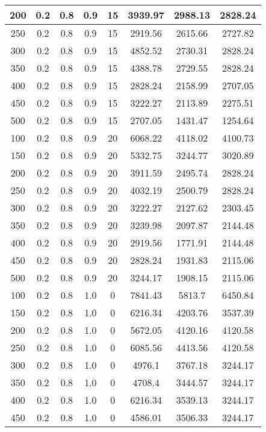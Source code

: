 \documentclass[a4paper, 12pt]{extreport}
\begin{document}
\begin{itemize}
\begin{longtable}{|c|c|c|c|c|c|c|c|}
			200 & 0.2 & 0.8 & 0.9 & 15 & 3939.97 & 2988.13 & 2828.24 \\\hline
			250 & 0.2 & 0.8 & 0.9 & 15 & 2919.56 & 2615.66 & 2727.82 \\\hline
			300 & 0.2 & 0.8 & 0.9 & 15 & 4852.52 & 2730.31 & 2828.24 \\\hline
			350 & 0.2 & 0.8 & 0.9 & 15 & 4388.78 & 2729.55 & 2828.24 \\\hline
			400 & 0.2 & 0.8 & 0.9 & 15 & 2828.24 & 2158.99 & 2707.05 \\\hline
			450 & 0.2 & 0.8 & 0.9 & 15 & 3222.27 & 2113.89 & 2275.51 \\\hline
			500 & 0.2 & 0.8 & 0.9 & 15 & 2707.05 & 1431.47 & 1254.64 \\\hline
			100 & 0.2 & 0.8 & 0.9 & 20 & 6068.22 & 4118.02 & 4100.73 \\\hline
			150 & 0.2 & 0.8 & 0.9 & 20 & 5332.75 & 3244.77 & 3020.89 \\\hline
			200 & 0.2 & 0.8 & 0.9 & 20 & 3911.59 & 2495.74 & 2828.24 \\\hline
			250 & 0.2 & 0.8 & 0.9 & 20 & 4032.19 & 2500.79 & 2828.24 \\\hline
			300 & 0.2 & 0.8 & 0.9 & 20 & 3222.27 & 2127.62 & 2303.45 \\\hline
			350 & 0.2 & 0.8 & 0.9 & 20 & 3239.98 & 2097.87 & 2144.48 \\\hline
			400 & 0.2 & 0.8 & 0.9 & 20 & 2919.56 & 1771.91 & 2144.48 \\\hline
			450 & 0.2 & 0.8 & 0.9 & 20 & 2828.24 & 1931.83 & 2115.06 \\\hline
			500 & 0.2 & 0.8 & 0.9 & 20 & 3244.17 & 1908.15 & 2115.06 \\\hline
			100 & 0.2 & 0.8 & 1.0 & 0 & 7841.43 & 5813.7 & 6450.84 \\\hline
			150 & 0.2 & 0.8 & 1.0 & 0 & 6216.34 & 4203.76 & 3537.39 \\\hline
			200 & 0.2 & 0.8 & 1.0 & 0 & 5672.05 & 4120.16 & 4120.58 \\\hline
			250 & 0.2 & 0.8 & 1.0 & 0 & 6085.56 & 4413.56 & 4120.58 \\\hline
			300 & 0.2 & 0.8 & 1.0 & 0 & 4976.1 & 3767.18 & 3244.17 \\\hline
			350 & 0.2 & 0.8 & 1.0 & 0 & 4708.4 & 3444.57 & 3244.17 \\\hline
			400 & 0.2 & 0.8 & 1.0 & 0 & 6216.34 & 3539.13 & 3244.17 \\\hline
			450 & 0.2 & 0.8 & 1.0 & 0 & 4586.01 & 3506.33 & 3244.17 \\\hline

\end{longtable}
\end{itemize}
\end{document}
